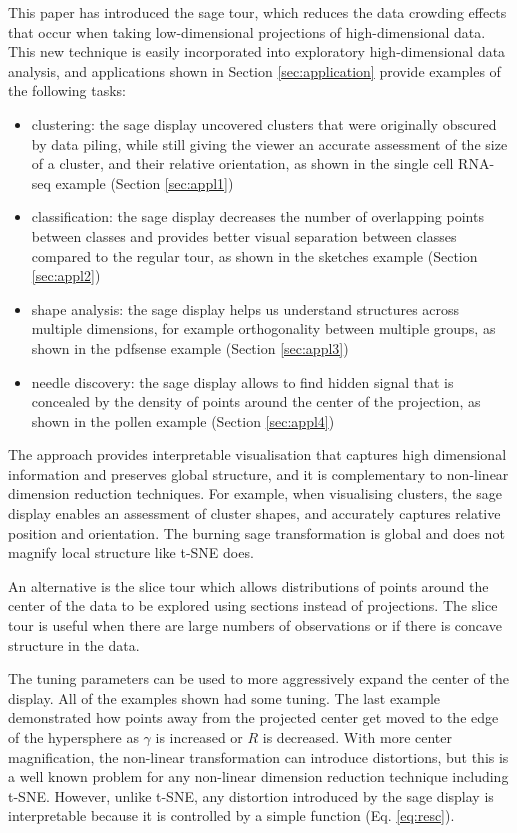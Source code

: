 \documentclass[]{interact}
\theoremstyle{plain}%
\theoremstyle{definition}
\theoremstyle{remark}
\def\tightlist{}
\begin{document}
This paper has introduced the sage tour, which reduces the data crowding
effects that occur when taking low-dimensional projections of
high-dimensional data. This new technique is easily incorporated into
exploratory high-dimensional data analysis, and applications shown in
Section \ref{sec:application} provide examples of the following tasks:

\begin{itemize}
\tightlist
\item
  clustering: the sage display uncovered clusters that were originally
  obscured by data piling, while still giving the viewer an accurate
  assessment of the size of a cluster, and their relative orientation,
  as shown in the single cell RNA-seq example (Section \ref{sec:appl1})
\item
  classification: the sage display decreases the number of overlapping
  points between classes and provides better visual separation between
  classes compared to the regular tour, as shown in the sketches example
  (Section \ref{sec:appl2})
\item
  shape analysis: the sage display helps us understand structures across
  multiple dimensions, for example orthogonality between multiple
  groups, as shown in the pdfsense example (Section \ref{sec:appl3})
\item
  needle discovery: the sage display allows to find hidden signal that
  is concealed by the density of points around the center of the
  projection, as shown in the pollen example (Section \ref{sec:appl4})
\end{itemize}

The approach provides interpretable visualisation that captures high
dimensional information and preserves global structure, and it is
complementary to non-linear dimension reduction techniques. For example,
when visualising clusters, the sage display enables an assessment of
cluster shapes, and accurately captures relative position and
orientation. The burning sage transformation is global and does not
magnify local structure like t-SNE does.

An alternative is the slice tour \citep{sliceTour} which allows
distributions of points around the center of the data to be explored
using sections instead of projections. The slice tour is useful when
there are large numbers of observations or if there is concave structure
in the data.

The tuning parameters can be used to more aggressively expand the center
of the display. All of the examples shown had some tuning. The last
example demonstrated how points away from the projected center get moved
to the edge of the hypersphere as \(\gamma\) is increased or \(R\) is
decreased. With more center magnification, the non-linear transformation
can introduce distortions, but this is a well known problem for any
non-linear dimension reduction technique including t-SNE. However,
unlike t-SNE, any distortion introduced by the sage display is
interpretable because it is controlled by a simple function (Eq.
\ref{eq:resc}).
\end{document}
